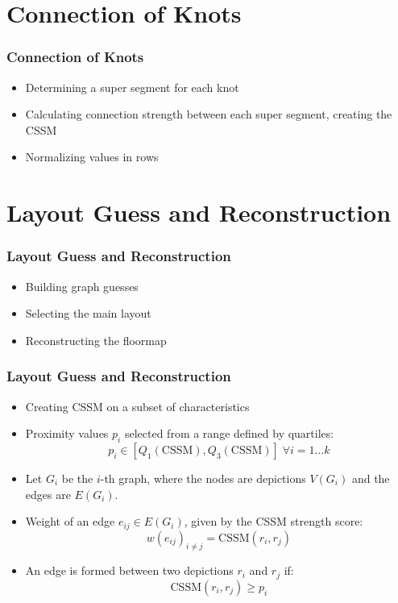 \documentclass{beamer}
\begin{document}
\section{Connection of Knots}
\begin{frame}
\frametitle{Connection of Knots}
\begin{itemize}
    \item Determining a super segment for each knot
    \item Calculating connection strength between each super segment, creating the CSSM
    \item Normalizing values in rows
\end{itemize}
\end{frame}

\section{Layout Guess and Reconstruction}
\begin{frame}
\frametitle{Layout Guess and Reconstruction}
\begin{itemize}
    \item Building graph guesses
    \item Selecting the main layout
    \item Reconstructing the floormap
\end{itemize}
\end{frame}

\begin{frame}
\frametitle{Layout Guess and Reconstruction}

    \begin{itemize}
    \item Creating CSSM on a subset of characteristics
    \item Proximity values \( p_i \) selected from a range defined by quartiles:
    \[
     p_i \in [Q_1(\text{CSSM}), Q_3(\text{CSSM})] \; \forall i=1\dots k
    \]
    
    \item Let \( G_i \) be the \( i \)-th graph, where the nodes are depictions \( V(G_i) \) and the edges are \( E(G_i) \).
    \item Weight of an edge \( e_{ij} \in E(G_i) \), given by the CSSM strength score:
    \[
    w(e_{ij})_{i\ne j} = \text{CSSM}(r_i, r_j)
    \]
    \item An edge is formed between two depictions \( r_i \) and \( r_j \) if:
    \[
    \text{CSSM}(r_i, r_j) \geq p_i
    \]
    
\end{itemize}
\end{frame}
\end{document}
